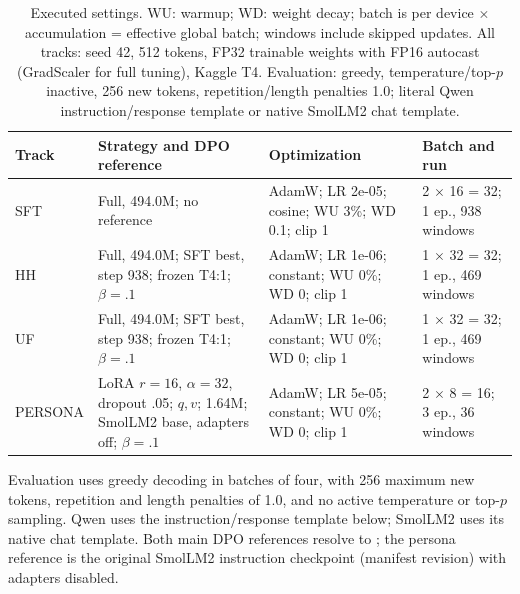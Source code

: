 \begin{table}[ht]\centering\small\setlength{\tabcolsep}{3pt}
\begin{tabularx}{\linewidth}{lXXX}\toprule Track & Strategy and DPO reference & Optimization & Batch and run\\\midrule
SFT & Full, 494.0M; no reference & AdamW; LR 2e-05; cosine; WU 3\%; WD 0.1; clip 1 & 2 $\times$ 16 = 32; 1 ep., 938 windows\\
HH & Full, 494.0M; SFT best, step 938; frozen T4:1; $\beta=.1$ & AdamW; LR 1e-06; constant; WU 0\%; WD 0; clip 1 & 1 $\times$ 32 = 32; 1 ep., 469 windows\\
UF & Full, 494.0M; SFT best, step 938; frozen T4:1; $\beta=.1$ & AdamW; LR 1e-06; constant; WU 0\%; WD 0; clip 1 & 1 $\times$ 32 = 32; 1 ep., 469 windows\\
PERSONA & LoRA $r=16$, $\alpha=32$, dropout .05; $q,v$; 1.64M; SmolLM2 base, adapters off; $\beta=.1$ & AdamW; LR 5e-05; constant; WU 0\%; WD 0; clip 1 & 2 $\times$ 8 = 16; 3 ep., 36 windows\\
\bottomrule\end{tabularx}\caption{Executed settings. WU: warmup; WD: weight decay; batch is per device $\times$ accumulation = effective global batch; windows include skipped updates. All tracks: seed 42, 512 tokens, FP32 trainable weights with FP16 autocast (GradScaler for full tuning), Kaggle T4. Evaluation: greedy, temperature/top-$p$ inactive, 256 new tokens, repetition/length penalties 1.0; literal Qwen instruction/response template or native SmolLM2 chat template.}\end{table}
Evaluation uses greedy decoding in batches of four, with 256 maximum new tokens, repetition and length penalties of 1.0, and no active temperature or top-$p$ sampling. Qwen uses the instruction/response template below; SmolLM2 uses its native chat template. Both main DPO references resolve to ; the persona reference is the original SmolLM2 instruction checkpoint (manifest revision) with adapters disabled.
